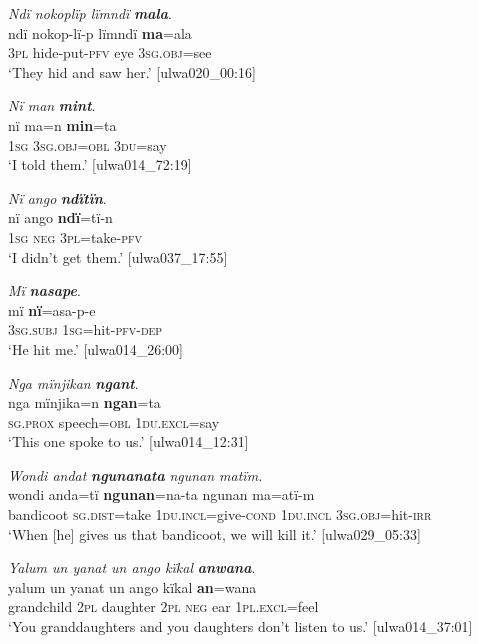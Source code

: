 \ea%
    \label{ex:det:71}
          \textit{Ndï nokoplïp lïmndï} \textbf{\textit{mala}}.\\
\gll ndï  nokop-lï-p    lïmndï  \textbf{ma}=ala\\
    3\textsc{pl}  hide-put-\textsc{pfv}  eye    \textsc{3sg.obj}=see\\
\glt `They hid and saw her.’ [ulwa020\_00:16]
\z


\ea%
    \label{ex:det:72}
          \textit{Nï man} \textbf{\textit{mint}}.\\
\gll nï    ma=n      \textbf{min}=ta\\
    1\textsc{sg}  3\textsc{sg.obj=obl}  \textsc{3du=}say\\
\glt `I told them.’ [ulwa014\_72:19]
\z

\ea%
    \label{ex:det:73}
          \textit{Nï ango} \textbf{\textit{ndïtïn}}.\\
\gll nï    ango  \textbf{ndï}=tï-n\\
    1\textsc{sg}  \textsc{neg}  3\textsc{pl}=take-\textsc{pfv}\\
\glt `I didn’t get them.’ [ulwa037\_17:55]
\z

\ea%
    \label{ex:det:74}
          \textit{Mï} \textbf{\textit{nasape}}.\\
\gll mï      \textbf{nï}=asa-p-e\\
    3\textsc{sg.subj}  1\textsc{sg}=hit-\textsc{pfv-dep}\\
\glt `He hit me.’ [ulwa014\_26:00]
\z

\ea%
    \label{ex:det:75}
          \textit{Nga mïnjikan} \textbf{\textit{ngant}}.\\
\gll nga      mïnjika=n    \textbf{ngan}=ta\\
    \textsc{sg.prox}  speech=\textsc{obl}  1\textsc{du.excl}=say\\
\glt `This one spoke to us.’ [ulwa014\_12:31]
\z

\ea%
    \label{ex:det:76}
          \textit{Wondi andat} \textbf{\textit{ngunanata}} \textit{ngunan matïm.}\\
\gll    wondi    anda=tï    \textbf{ngunan}=na-ta    ngunan ma=atï-m\\
    bandicoot  \textsc{sg.dist}=take  1\textsc{du.incl}=give-\textsc{cond}  1\textsc{du.incl}           3\textsc{sg.obj}=hit-\textsc{irr}\\
\glt       ‘When [he] gives us that bandicoot, we will kill it.’ [ulwa029\_05:33]
\z

\ea%
    \label{ex:det:77}
          \textit{Yalum un yanat un ango kïkal} \textbf{\textit{anwana}}.\\
\gll yalum    un  yanat    un  ango  kïkal  \textbf{an}=wana\\
    grandchild  \textsc{2pl}  daughter  \textsc{2pl}  \textsc{neg}  ear    \textsc{1pl.excl}=feel\\
\glt `You granddaughters and you daughters don’t listen to us.’ [ulwa014\_37:01]
\z

